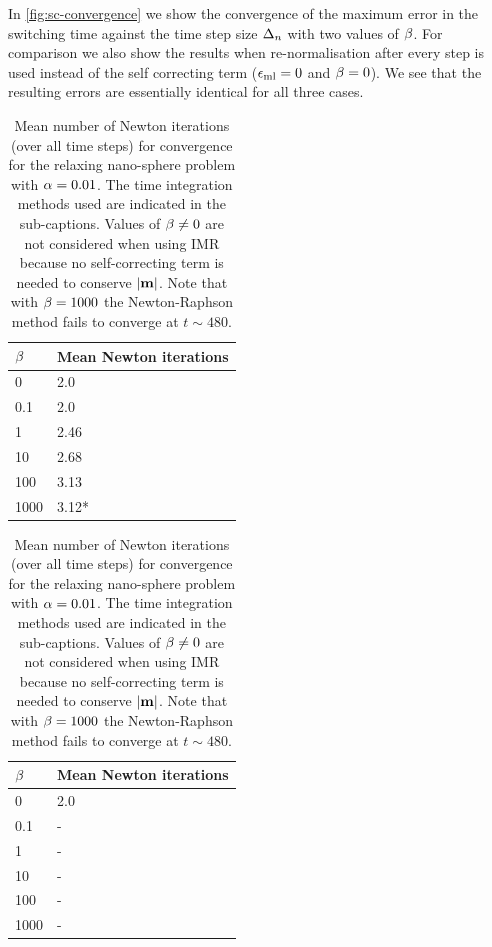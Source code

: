 In \cref{fig:sc-convergence} we show the convergence of the maximum error in the switching time against the time step size $\Delta_{n}$ with two values of $\beta$.
For comparison we also show the results when re-normalisation after every step is used instead of the self correcting term (\ie $\epsilon_{\mathrm{ml}} = 0$ and $\beta = 0$).
We see that the resulting errors are essentially identical for all three cases.

\begin{table}
  \begin{subtable}{.5\textwidth}
    \centering
    \begin{tabular}{ll}
      $\beta$ & Mean Newton iterations \\
      \hline
      0 & 2.0 \\
      0.1 & 2.0 \\
      1 & 2.46 \\
      10 & 2.68 \\
      100 & 3.13 \\
      1000 & 3.12* \\
    \end{tabular}%
    \caption{Solved with BDF2 and $\ntol = 10^{-8}$. Magnetisation length is enforced by use of the self-correcting LLG.}
  \end{subtable}%
  \begin{subtable}{.5\textwidth}
    \centering
    \begin{tabular}{ll}
      $\beta$ & Mean Newton iterations \\
      \hline
      0 & 2.0 \\
      0.1 & - \\
      1 & - \\
      10 & - \\
      100 & - \\
      1000 & - \\
    \end{tabular}%
    \vfill
    \caption{Solved with IMR and $\ntol = 10^{-12}$}
  \end{subtable}%
  \caption{
    Mean number of Newton iterations (over all time steps) for convergence
    for the relaxing nano-sphere problem with
    $\alpha = 0.01$.
    The time integration methods used are indicated in the sub-captions.
    Values of $\beta \neq 0$ are not considered when using IMR because no self-correcting term is needed to conserve $\left|{\boldsymbol{\mathrm{m}}} \right|$.
    Note that with $\beta = 1000$ the Newton-Raphson method fails to converge at $t \sim 480$.
  }
  \label{tab:sc-newton-iters}
\end{table}


